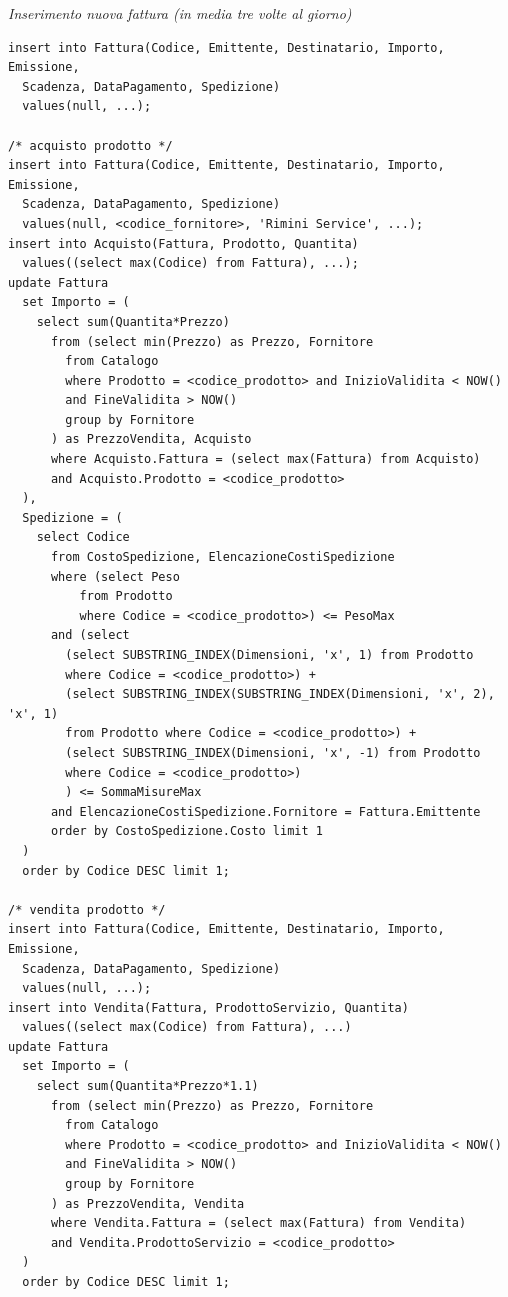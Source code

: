 \noindent\textit{Inserimento nuova fattura (in media tre volte al giorno)}
\begin{verbatim}
insert into Fattura(Codice, Emittente, Destinatario, Importo, Emissione,
  Scadenza, DataPagamento, Spedizione)
  values(null, ...);

/* acquisto prodotto */
insert into Fattura(Codice, Emittente, Destinatario, Importo, Emissione,
  Scadenza, DataPagamento, Spedizione)
  values(null, <codice_fornitore>, 'Rimini Service', ...);
insert into Acquisto(Fattura, Prodotto, Quantita)
  values((select max(Codice) from Fattura), ...);
update Fattura
  set Importo = (
    select sum(Quantita*Prezzo)
      from (select min(Prezzo) as Prezzo, Fornitore
        from Catalogo
        where Prodotto = <codice_prodotto> and InizioValidita < NOW()
        and FineValidita > NOW()
        group by Fornitore
      ) as PrezzoVendita, Acquisto
      where Acquisto.Fattura = (select max(Fattura) from Acquisto)
      and Acquisto.Prodotto = <codice_prodotto>
  ),
  Spedizione = (
    select Codice
      from CostoSpedizione, ElencazioneCostiSpedizione
      where (select Peso
          from Prodotto
          where Codice = <codice_prodotto>) <= PesoMax
      and (select
        (select SUBSTRING_INDEX(Dimensioni, 'x', 1) from Prodotto
        where Codice = <codice_prodotto>) +
        (select SUBSTRING_INDEX(SUBSTRING_INDEX(Dimensioni, 'x', 2), 'x', 1)
        from Prodotto where Codice = <codice_prodotto>) +
        (select SUBSTRING_INDEX(Dimensioni, 'x', -1) from Prodotto
        where Codice = <codice_prodotto>)
        ) <= SommaMisureMax
      and ElencazioneCostiSpedizione.Fornitore = Fattura.Emittente
      order by CostoSpedizione.Costo limit 1
  )
  order by Codice DESC limit 1;

/* vendita prodotto */
insert into Fattura(Codice, Emittente, Destinatario, Importo, Emissione,
  Scadenza, DataPagamento, Spedizione)
  values(null, ...);
insert into Vendita(Fattura, ProdottoServizio, Quantita)
  values((select max(Codice) from Fattura), ...)
update Fattura
  set Importo = (
    select sum(Quantita*Prezzo*1.1)
      from (select min(Prezzo) as Prezzo, Fornitore
        from Catalogo
        where Prodotto = <codice_prodotto> and InizioValidita < NOW()
        and FineValidita > NOW()
        group by Fornitore
      ) as PrezzoVendita, Vendita
      where Vendita.Fattura = (select max(Fattura) from Vendita)
      and Vendita.ProdottoServizio = <codice_prodotto>
  )
  order by Codice DESC limit 1;
\end{verbatim}
\vspace{1cm}

